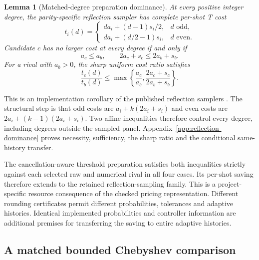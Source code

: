 \documentclass[11pt]{article}
\newtheorem{lemma}[theorem]{Lemma}
\begin{document}
\begin{lemma}[Matched-degree preparation dominance]
\label{lem:representation-sampler-dominance}
At every positive integer degree, the parity-specific reflection sampler
has complete per-shot T cost
\begin{equation}
t_i(d)=\begin{cases}
da_i+(d-1)s_i/2,&d\text{ odd},\\
da_i+(d/2-1)s_i,&d\text{ even}.
\end{cases}
\label{eq:representation-parity-cost}
\end{equation}
Candidate $c$ has no larger cost at every degree if and only if
\begin{equation}
a_c\leq a_b,\qquad2a_c+s_c\leq2a_b+s_b.
\label{eq:representation-all-degree-condition}
\end{equation}
For a rival with $a_b>0$, the sharp uniform cost ratio satisfies
\begin{equation}
\frac{t_c(d)}{t_b(d)}\leq
\max\left\{\frac{a_c}{a_b},\frac{2a_c+s_c}{2a_b+s_b}\right\}.
\label{eq:representation-all-degree-ratio}
\end{equation}
\end{lemma}
This is an implementation corollary of the published reflection samplers \citep{suzuki2020,rallfuller2023}. The structural step is that odd costs are $a_i+k(2a_i+s_i)$ and even
costs are $2a_i+(k-1)(2a_i+s_i)$. Two affine inequalities therefore
control every degree, including degrees outside the sampled panel.
Appendix~\ref{app:reflection-dominance} proves necessity, sufficiency,
the sharp ratio and the conditional same-history transfer.

The cancellation-aware threshold preparation satisfies both inequalities strictly
against each selected raw and numerical rival in all four cases. Its
per-shot saving therefore extends to the retained reflection-sampling
family. This is a project-specific resource consequence of the checked
pricing representation. Different rounding certificates permit different
probabilities, tolerances and adaptive histories. Identical implemented
probabilities and controller information are additional premises for
transferring the saving to entire adaptive histories.

\subsection{A matched bounded Chebyshev comparison}
\end{document}
